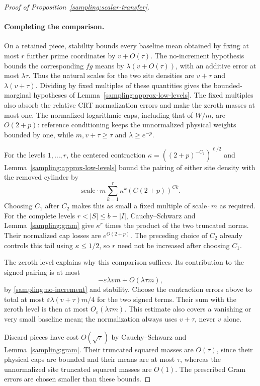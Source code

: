 \begin{proof}[Proof of Proposition~\ref{sampling:scalar-transfer}]
\paragraph{Completing the comparison.}
On a retained piece, stability bounds every baseline mean obtained
by fixing at most $r$ further prime coordinates by $v+O(\tau)$.
The no-increment hypothesis bounds the corresponding $fg$ means
by $\lambda(v+O(\tau))$, with an additive error at most
$\lambda\tau$.  Thus the natural scales for the two site densities
are $v+\tau$ and $\lambda(v+\tau)$.  Dividing by fixed multiples
of these quantities gives the bounded-marginal hypotheses of
Lemma~\ref{sampling:approx-low-levels}.  The fixed multiples also
absorb the relative CRT normalization errors and make the zeroth
masses at most one.  The normalized logarithmic caps, including
that of $W/m$, are $O(2+p)$: reference conditioning keeps the
unnormalized physical weights bounded by one, while
$m,v+\tau\ge\tau$ and $\lambda\ge e^{-p}$.

For the levels $1,\ldots,r$, the centered contraction
$\kappa=((2+p)^{-C_1})^{\ell/2}$ and
Lemma~\ref{sampling:approx-low-levels} bound the pairing of either
site density with the removed cylinder by
\[
 \text{scale}\cdot m\sum_{k=1}^r
       \kappa^k(C(2+p))^{Ck}.
\]
Choosing $C_1$ after $C_2$ makes this as small a fixed multiple
of $\text{scale}\cdot m$ as required.  For the complete levels
$r<|S|\le b-|I|$, Cauchy--Schwarz and
Lemma~\ref{sampling:gram} give $\kappa^r$ times the product of
the two truncated norms.  Their normalized cap losses are
$e^{O(2+p)}$.  The preceding choice of $C_2$ already controls
this tail using $\kappa\le1/2$, so $r$ need not be increased
after choosing $C_1$.

The zeroth level explains why this comparison suffices.  Its
contribution to the signed pairing is at most
\[
                    -\varepsilon\lambda vm+O(\lambda\tau m),
\]
by \eqref{sampling:no-increment} and stability.  Choose the
contraction errors above to total at most
$\varepsilon\lambda(v+\tau)m/4$ for the two signed terms.
Their sum with the zeroth level is then at most
$O_\varepsilon(\lambda\tau m)$.  This estimate also covers a
vanishing or very small baseline mean; the normalization always
uses $v+\tau$, never $v$ alone.

Discard pieces have cost $O(\sqrt\tau)$ by Cauchy--Schwarz and
Lemma~\ref{sampling:gram}.  Their truncated squared masses are
$O(\tau)$, since their physical caps are bounded and their means
are at most $\tau$, whereas the unnormalized site truncated
squared masses are $O(1)$.  The prescribed Gram errors are chosen
smaller than these bounds.


\end{proof}
